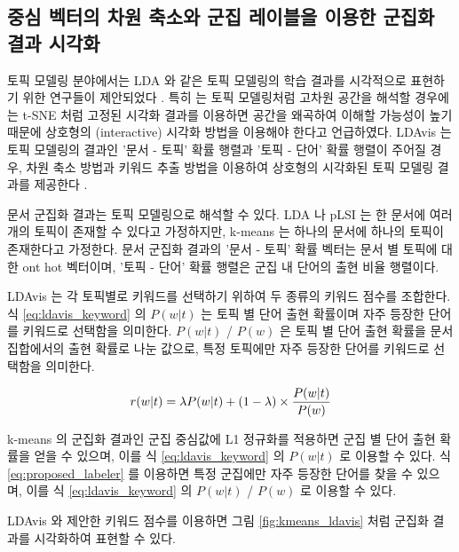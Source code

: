 \documentclass[11pt]{article}
\begin{document}
\subsection{중심 벡터의 차원 축소와 군집 레이블을 이용한 군집화 결과 시각화}

토픽 모델링 분야에서는 LDA 와 같은 토픽 모델링의 학습 결과를 시각적으로 표현하기 위한 연구들이 제안되었다 \citep{sievert2014ldavis, chuang2012interpretation, snyder2013topic, chuang2012termite, gretarsson2012topicnets, ramage2009topic}.
특히 \citep{chuang2012interpretation} 는 토픽 모델링처럼 고차원 공간을 해석할 경우에는 t-SNE \citep{maaten2008visualizing, van2014accelerating} 처럼 고정된 시각화 결과를 이용하면 공간을 왜곡하여 이해할 가능성이 높기 때문에 상호형의 (interactive) 시각화 방법을 이용해야 한다고 언급하였다.
LDAvis 는 토픽 모델링의 결과인 '문서 - 토픽' 확률 행렬과 '토픽 - 단어' 확률 행렬이 주어질 경우, 차원 축소 방법과 키워드 추출 방법을 이용하여 상호형의 시각화된 토픽 모델링 결과를 제공한다 \citep{sievert2014ldavis}.

문서 군집화 결과는 토픽 모델링으로 해석할 수 있다.
LDA \citep{blei2003latent} 나 pLSI \citep{hofmann1999probabilistic} 는 한 문서에 여러 개의 토픽이 존재할 수 있다고 가정하지만, k-means 는 하나의 문서에 하나의 토픽이 존재한다고 가정한다.
문서 군집화 결과의 '문서 - 토픽' 확률 벡터는 문서 별 토픽에 대한 ont hot 벡터이며, '토픽 - 단어' 확률 행렬은 군집 내 단어의 출현 비율 행렬이다.

LDAvis 는 각 토픽별로 키워드를 선택하기 위하여 두 종류의 키워드 점수를 조합한다.
식 \ref{eq:ldavis_keyword} 의 $P(w \vert t)$ 는 토픽 별 단어 출현 확률이며 자주 등장한 단어를 키워드로 선택함을 의미한다.
$P(w \vert t)$ / $P(w)$ 은 토픽 별 단어 출현 확률을 문서 집합에서의 출현 확률로 나눈 값으로, 특정 토픽에만 자주 등장한 단어를 키워드로 선택함을 의미한다.

\begin{equation}
\label{eq:ldavis_keyword}
\centering
r(w \vert t) = \lambda P(w \vert t) + (1 - \lambda) \times \frac{P(w \vert t)}{P(w)}
\end{equation}

k-means 의 군집화 결과인 군집 중심값에 L1 정규화를 적용하면 군집 별 단어 출현 확률을 얻을 수 있으며, 이를 식 \ref{eq:ldavis_keyword} 의 $P(w \vert t)$ 로 이용할 수 있다.
식 \ref{eq:proposed_labeler} 를 이용하면 특정 군집에만 자주 등장한 단어를 찾을 수 있으며, 이를 식 \ref{eq:ldavis_keyword} 의 $P(w \vert t)$ / $P(w)$ 로 이용할 수 있다.

LDAvis 와 제안한 키워드 점수를 이용하면 그림 \ref{fig:kmeans_ldavis} 처럼 군집화 결과를 시각화하여 표현할 수 있다.
\end{document}
